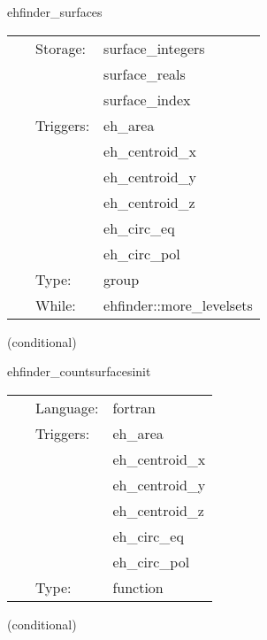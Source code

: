 \hspace{5mm} ehfinder\_surfaces 

\hspace{5mm}{\it count the number of surfaces and integrate over them } 


\hspace{5mm}

 \begin{tabular*}{160mm}{cll} 
~ & Storage:  & surface\_integers \\ 
~& ~ &surface\_reals\\ 
~& ~ &surface\_index\\ 
~ & Triggers:  & eh\_area \\ 
~& ~ &eh\_centroid\_x\\ 
~& ~ &eh\_centroid\_y\\ 
~& ~ &eh\_centroid\_z\\ 
~& ~ &eh\_circ\_eq\\ 
~& ~ &eh\_circ\_pol\\ 
~ & Type:  & group \\ 
~ & While:  & ehfinder::more\_levelsets \\ 
\end{tabular*} 


\vspace{5mm}

   (conditional) 

\hspace{5mm} ehfinder\_countsurfacesinit 

\hspace{5mm}{\it initialize while loop control } 


\hspace{5mm}

 \begin{tabular*}{160mm}{cll} 
~ & Language:  & fortran \\ 
~ & Triggers:  & eh\_area \\ 
~& ~ &eh\_centroid\_x\\ 
~& ~ &eh\_centroid\_y\\ 
~& ~ &eh\_centroid\_z\\ 
~& ~ &eh\_circ\_eq\\ 
~& ~ &eh\_circ\_pol\\ 
~ & Type:  & function \\ 
\end{tabular*} 


\vspace{5mm}

   (conditional) 

